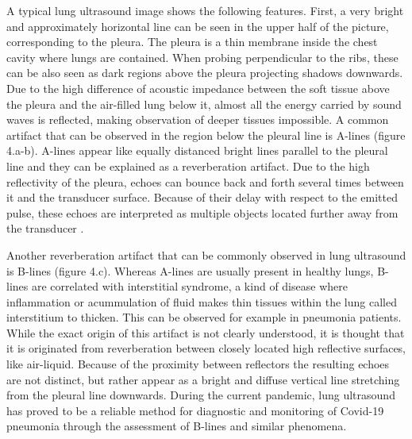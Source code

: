 \documentclass[11pt]{article} %
\begin{document}
	A typical lung ultrasound image shows the following features. First, a very bright and approximately horizontal line can be seen in the upper half of the picture, corresponding to the pleura. The pleura is a thin membrane inside the chest cavity where lungs are contained. When probing perpendicular to the ribs, these can be also seen as dark regions above the pleura projecting shadows downwards. Due to the high difference of acoustic impedance between the soft tissue above the pleura and the air-filled lung below it, almost all the energy carried by sound waves is reflected, making observation of deeper tissues impossible. A common artifact that can be observed in the region below the pleural line is A-lines (figure 4.a-b). A-lines appear like equally distanced bright lines parallel to the pleural line and they can be explained as a reverberation artifact. Due to the high reflectivity of the pleura, echoes can bounce back and forth several times between it and the transducer surface. Because of their delay with respect to the emitted pulse, these echoes are interpreted as multiple objects located further away from the transducer \cite{artifacts}.

	
	Another reverberation artifact that can be commonly observed in lung ultrasound is B-lines (figure 4.c). Whereas A-lines are usually present in healthy lungs, B-lines are correlated with interstitial syndrome, a kind of disease where inflammation or acummulation of fluid makes thin tissues within the lung called interstitium to thicken. This can be observed for example in pneumonia patients. While the exact origin of this artifact is not clearly understood, it is thought that it is originated from reverberation between closely located high reflective surfaces, like air-liquid. Because of the proximity between reflectors the resulting echoes are not distinct, but rather appear as a bright and diffuse vertical line stretching from the pleural line downwards. During the current pandemic, lung ultrasound has proved to be a reliable method for diagnostic and monitoring of Covid-19 pneumonia through the assessment of B-lines and similar phenomena.
	
\end{document}
